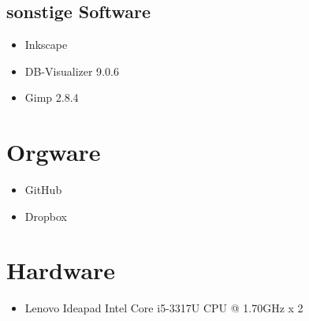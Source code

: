 \documentclass[a4paper]{scrreprt}
\begin{document}
        \subsection{sonstige Software}
            \begin{itemize}
            	\item Inkscape
            	\item DB-Visualizer 9.0.6
            	\item Gimp 2.8.4
            \end{itemize}
           
    \section{Orgware}
        \begin{itemize}
        	\item GitHub
        	\item Dropbox
        \end{itemize}
        
    \section{Hardware}
        \begin{itemize}
        	\item Lenovo Ideapad Intel Core i5-3317U CPU @ 1.70GHz x 2
        \end{itemize}
        
\printglossaries
\end{document}
